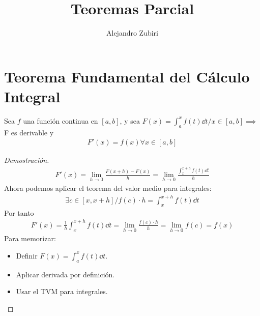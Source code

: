 \documentclass{article}
\title{Teoremas Parcial}
\author{Alejandro Zubiri}
\begin{document}
\maketitle
\section{Teorema Fundamental del Cálculo Integral}
    Sea $f$ una función continua en $[a,b]$, y sea $F(x)= \int _{a}^x f(t) \dd{t} / x \in [a,b] \implies $ F es
    derivable y
    \begin{equation}
        \begin{split}
            F'(x)=f(x) \forall x \in [a,b]
        \end{split}
    \end{equation}
\begin{proof}[Demostración]
    \begin{equation}
        \begin{split}
            F'(x) = \lim_{h \to 0} \frac{F(x+h) - F(x)}{h} = \lim_{h \to 0} \frac{ \int _{x}^{x+h} f(t) \dd{t}}{h}
        \end{split}
    \end{equation}
    Ahora podemos aplicar el teorema del valor medio para integrales:
    \begin{equation}
        \begin{split}
            \exists c \in [x,x+h] / f(c) \cdot h = \int _{x}^{x+h}f(t) \dd{t}
        \end{split}
    \end{equation}
    Por tanto
    \begin{equation}
        \begin{split}
            F'(x)= \frac{1}{h} \int _{x}^{x+h} f(t) \dd{t} = \lim_{h \to 0} \frac{f(c) \cdot h}{h}=\lim_{h \to 0}f(c)
            =f(x)
        \end{split}
    \end{equation}
Para memorizar:
\begin{itemize}
	\item Definir \(F(x) = \int_a^x f(t) \dd{t}\).
	\item Aplicar derivada por definición.
	\item Usar el TVM para integrales.
\end{itemize}
\end{proof}
\end{document}
